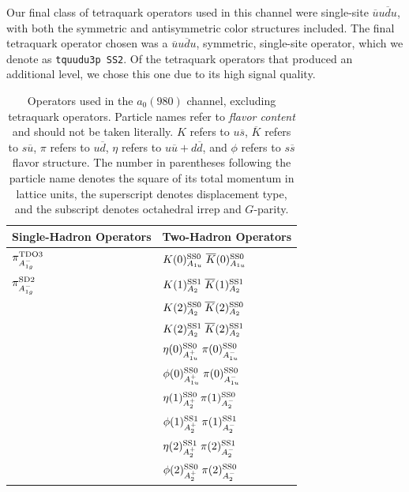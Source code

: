Our final class of tetraquark operators used in this channel were single-site $\overline u u \overline d u$, with both the symmetric and antisymmetric color structures included. The final tetraquark operator chosen was a $\overline u u \overline d u$, symmetric, single-site operator, which we denote as \verb+tquudu3p SS2+. Of the tetraquark operators that produced an additional level, we chose this one due to its high signal quality.
\begin{table}
  \centering
  \begin{tabular}{l|l}
    \textbf{Single-Hadron Operators} & \textbf{Two-Hadron Operators}\\
    \hline
    $\pi^{\rm{TDO}3}_{A_{1g}^-}$ & $K(0)^{\rm{SS}0}_{A_{1u}}\; \overline K(0)^{\rm{SS}0}_{A_{1u}}$\\
    $\pi^{\rm{SD}2}_{A_{1g}^-}$ & $K(1)^{\rm{SS}1}_{A_{2}}\; \overline K(1)^{\rm{SS}1}_{A_{2}}$ \\
    & $K(2)^{\rm{SS}0}_{A_{2}}\; \overline K(2)^{\rm{SS}0}_{A_{2}}$ \\
    & $K(2)^{\rm{SS}1}_{A_{2}}\; \overline K(2)^{\rm{SS}1}_{A_{2}}$ \\
    & $\eta(0)^{\rm{SS}0}_{A_{1u}^+}\; \pi(0)^{\rm{SS}0}_{A_{1u}^-}$ \\
    & $\phi(0)^{\rm{SS}0}_{A_{1u}^+}\; \pi(0)^{\rm{SS}0}_{A_{1u}^-}$ \\
    & $\eta(1)^{\rm{SS}0}_{A_{2}^+}\; \pi(1)^{\rm{SS}0}_{A_{2}^-}$ \\
    & $\phi(1)^{\rm{SS}1}_{A_{2}^+}\; \pi(1)^{\rm{SS}1}_{A_{2}^-}$ \\
    & $\eta(2)^{\rm{SS}1}_{A_{2}^+}\; \pi(2)^{\rm{SS}1}_{A_{2}^-}$ \\
    & $\phi(2)^{\rm{SS}0}_{A_{2}^+}\; \pi(2)^{\rm{SS}0}_{A_{2}^-}$ 
  \end{tabular}
  \caption[Operators used in the $a_0(980)$ channel, excluding tetraquark operators.]{Operators used in the $a_0(980)$ channel, excluding tetraquark operators. Particle names refer to \emph{flavor content} and should not be taken literally. $K$ refers to $u\overline s$, $\overline K$ refers to $s \overline u$, $\pi$ refers to $u\overline d$, $\eta$ refers to $u\overline u + d\overline d$, and $\phi$ refers to $s\overline s$ flavor structure. The number in parentheses following the particle name denotes the square of its total momentum in lattice units, the superscript denotes displacement type, and the subscript denotes octahedral irrep and $G$-parity.}
  \label{table:a0_ops_no_tq}
\end{table}
